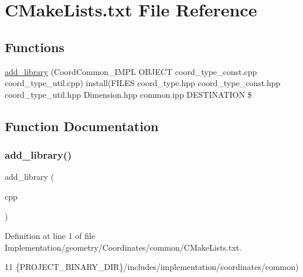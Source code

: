 \hypertarget{Implementation_2geometry_2Coordinates_2common_2CMakeLists_8txt}{}\section{C\+Make\+Lists.\+txt File Reference}
\label{Implementation_2geometry_2Coordinates_2common_2CMakeLists_8txt}
\subsection*{Functions}
\begin{DoxyCompactItemize}
\item 
\hyperlink{Implementation_2geometry_2Coordinates_2common_2CMakeLists_8txt_a82ea87b6eaa9d15c47af47517bff0184}{add\+\_\+library} (Coord\+Common\+\_\+\+I\+M\+PL O\+B\+J\+E\+CT coord\+\_\+type\+\_\+const.\+cpp coord\+\_\+type\+\_\+util.\+cpp) install(F\+I\+L\+ES coord\+\_\+type.\+hpp coord\+\_\+type\+\_\+const.\+hpp coord\+\_\+type\+\_\+util.\+hpp Dimension.\+hpp common.\+ipp D\+E\+S\+T\+I\+N\+A\+T\+I\+ON \$
\end{DoxyCompactItemize}


\subsection{Function Documentation}
\mbox{\label{Implementation_2geometry_2Coordinates_2common_2CMakeLists_8txt_a82ea87b6eaa9d15c47af47517bff0184}} 
\subsubsection{\texorpdfstring{add\+\_\+library()}{add\_library()}}
{\footnotesize\ttfamily add\+\_\+library (\begin{DoxyParamCaption}\item[{Coord\+Common\+\_\+\+I\+M\+PL O\+B\+J\+E\+CT coord\+\_\+type\+\_\+const.\+cpp coord\+\_\+type\+\_\+util.}]{cpp }\end{DoxyParamCaption})}



Definition at line 1 of file Implementation/geometry/\+Coordinates/common/\+C\+Make\+Lists.\+txt.


\begin{DoxyCode}
11                \{PROJECT\_BINARY\_DIR\}/includes/implementation/coordinates/common)
\end{DoxyCode}
